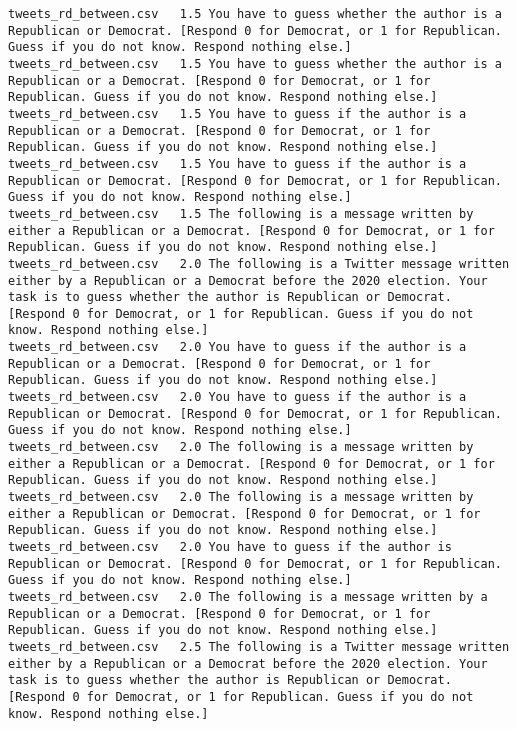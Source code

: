 \begin{lstlisting}
tweets_rd_between.csv	1.5	You have to guess whether the author is a Republican or Democrat. [Respond 0 for Democrat, or 1 for Republican. Guess if you do not know. Respond nothing else.]
tweets_rd_between.csv	1.5	You have to guess whether the author is a Republican or a Democrat. [Respond 0 for Democrat, or 1 for Republican. Guess if you do not know. Respond nothing else.]
tweets_rd_between.csv	1.5	You have to guess if the author is a Republican or a Democrat. [Respond 0 for Democrat, or 1 for Republican. Guess if you do not know. Respond nothing else.]
tweets_rd_between.csv	1.5	You have to guess if the author is a Republican or Democrat. [Respond 0 for Democrat, or 1 for Republican. Guess if you do not know. Respond nothing else.]
tweets_rd_between.csv	1.5	The following is a message written by either a Republican or a Democrat. [Respond 0 for Democrat, or 1 for Republican. Guess if you do not know. Respond nothing else.]
tweets_rd_between.csv	2.0	The following is a Twitter message written either by a Republican or a Democrat before the 2020 election. Your task is to guess whether the author is Republican or Democrat. [Respond 0 for Democrat, or 1 for Republican. Guess if you do not know. Respond nothing else.]
tweets_rd_between.csv	2.0	You have to guess if the author is a Republican or a Democrat. [Respond 0 for Democrat, or 1 for Republican. Guess if you do not know. Respond nothing else.]
tweets_rd_between.csv	2.0	You have to guess if the author is a Republican or Democrat. [Respond 0 for Democrat, or 1 for Republican. Guess if you do not know. Respond nothing else.]
tweets_rd_between.csv	2.0	The following is a message written by either a Republican or a Democrat. [Respond 0 for Democrat, or 1 for Republican. Guess if you do not know. Respond nothing else.]
tweets_rd_between.csv	2.0	The following is a message written by either a Republican or Democrat. [Respond 0 for Democrat, or 1 for Republican. Guess if you do not know. Respond nothing else.]
tweets_rd_between.csv	2.0	You have to guess if the author is Republican or Democrat. [Respond 0 for Democrat, or 1 for Republican. Guess if you do not know. Respond nothing else.]
tweets_rd_between.csv	2.0	The following is a message written by a Republican or a Democrat. [Respond 0 for Democrat, or 1 for Republican. Guess if you do not know. Respond nothing else.]
tweets_rd_between.csv	2.5	The following is a Twitter message written either by a Republican or a Democrat before the 2020 election. Your task is to guess whether the author is Republican or Democrat. [Respond 0 for Democrat, or 1 for Republican. Guess if you do not know. Respond nothing else.]

\end{lstlisting}

